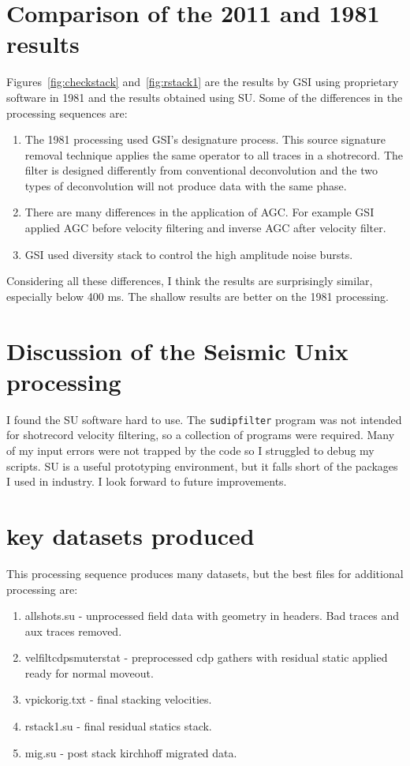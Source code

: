 
\section{Comparison of the 2011 and 1981 results}
Figures~\ref{fig:checkstack} and~\ref{fig:rstack1} are the results by GSI 
using proprietary software in 1981 and the results obtained using SU.  
Some of the differences in the processing sequences are:
\begin{enumerate}
\item The 1981 processing used GSI's designature process.  This source 
signature removal technique applies the same operator to all traces in a 
shotrecord.  The filter is designed differently from conventional 
deconvolution and the two types of deconvolution will not produce data 
with the same phase. 
\item There are many differences in the application of AGC.  For example 
GSI applied AGC before velocity filtering and inverse AGC after velocity 
filter.
\item GSI used diversity stack to control the high amplitude noise bursts.
\end{enumerate}
Considering all these differences, I think the results are surprisingly 
similar, especially below 400 ms.  The shallow results are better on the 
1981 processing.

\section{Discussion of the Seismic Unix processing}
I found the SU software hard to use.  The \texttt{sudipfilter} program
was not intended for shotrecord velocity filtering, so a collection of
programs were required.  Many of my input errors were not trapped by
the code so I struggled to debug my scripts.  SU is a useful
prototyping environment, but it falls short of the packages I used in 
industry.  I look forward to future improvements.

\section{key datasets produced}
This processing sequence produces many datasets, but the best files for 
additional processing are:
\begin{enumerate}
\item allshots.su - unprocessed field data with geometry in headers.  Bad 
traces and aux traces removed.
\item velfiltcdpsmuterstat - preprocessed cdp gathers with residual static 
applied ready for normal moveout.
\item vpickorig.txt - final stacking velocities.
\item rstack1.su - final residual statics stack.
\item mig.su - post stack kirchhoff migrated data.
\end{enumerate}

